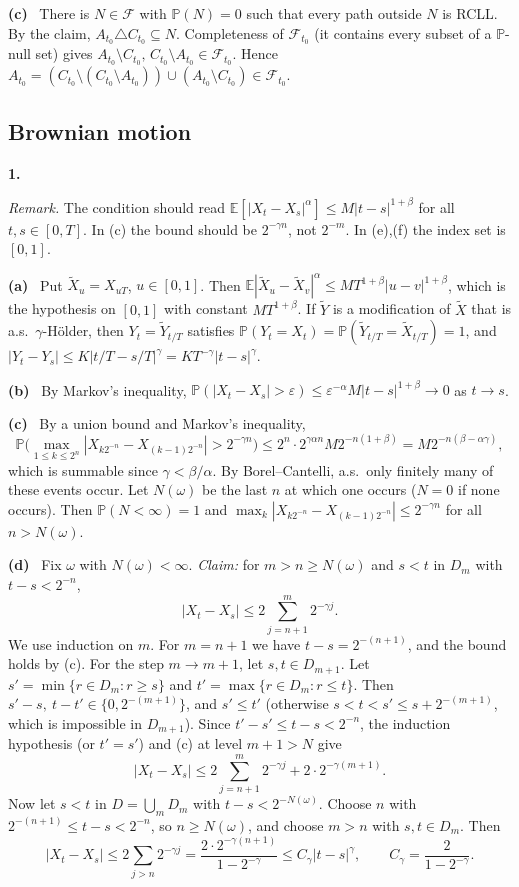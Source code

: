 \documentclass[11pt,a4paper]{article}
\newcommand{\E}{\mathbb{E}}
\renewcommand{\P}{\mathbb{P}}
\newcommand{\F}{\mathcal{F}}
\newcommand{\1}{\mathbf{1}}
\newcommand{\prob}[1]{\par\medskip\noindent\textbf{#1}\quad}
\newcommand{\sub}[1]{\par\smallskip\noindent\textbf{#1}\ }
\newcommand{\note}[1]{\par\noindent\emph{Remark.} #1}
\begin{document}
\sub{(c)} There is $N\in\F$ with $\P(N)=0$ such that every path outside $N$ is RCLL. By the claim,
$A_{t_0}\triangle C_{t_0}\subseteq N$. Completeness of $\F_{t_0}$ (it contains every subset of a
$\P$-null set) gives $A_{t_0}\setminus C_{t_0},\,C_{t_0}\setminus A_{t_0}\in\F_{t_0}$. Hence
$A_{t_0}=(C_{t_0}\setminus(C_{t_0}\setminus A_{t_0}))\cup(A_{t_0}\setminus C_{t_0})\in\F_{t_0}$.

\subsection*{Brownian motion}

\prob{1.}
\note{The condition should read $\E[|X_t-X_s|^\alpha]\le M|t-s|^{1+\beta}$ for all $t,s\in[0,T]$. In (c) the
bound should be $2^{-\gamma n}$, not $2^{-m}$. In (e),(f) the index set is $[0,1]$.}

\sub{(a)} Put $\tilde X_u=X_{uT}$, $u\in[0,1]$. Then $\E|\tilde X_u-\tilde X_v|^\alpha\le
MT^{1+\beta}|u-v|^{1+\beta}$, which is the hypothesis on $[0,1]$ with constant $MT^{1+\beta}$. If
$\tilde Y$ is a modification of $\tilde X$ that is a.s.\ $\gamma$-H\"older, then
$Y_t=\tilde Y_{t/T}$ satisfies $\P(Y_t=X_t)=\P(\tilde Y_{t/T}=\tilde X_{t/T})=1$, and
$|Y_t-Y_s|\le K|t/T-s/T|^\gamma=KT^{-\gamma}|t-s|^\gamma$.

\sub{(b)} By Markov's inequality, $\P(|X_t-X_s|>\varepsilon)\le\varepsilon^{-\alpha}M|t-s|^{1+\beta}\to0$ as $t\to s$.

\sub{(c)} By a union bound and Markov's inequality,
\[
\P\Big(\max_{1\le k\le 2^n}|X_{k2^{-n}}-X_{(k-1)2^{-n}}|>2^{-\gamma n}\Big)
\le 2^n\cdot 2^{\gamma\alpha n}M2^{-n(1+\beta)}=M2^{-n(\beta-\alpha\gamma)},
\]
which is summable since $\gamma<\beta/\alpha$. By Borel--Cantelli, a.s.\ only finitely many of these
events occur. Let $N(\omega)$ be the last $n$ at which one occurs ($N=0$ if none occurs). Then
$\P(N<\infty)=1$ and $\max_k|X_{k2^{-n}}-X_{(k-1)2^{-n}}|\le2^{-\gamma n}$ for all $n>N(\omega)$.

\sub{(d)} Fix $\omega$ with $N(\omega)<\infty$.
\emph{Claim:} for $m>n\ge N(\omega)$ and $s<t$ in $D_m$ with $t-s<2^{-n}$,
\[|X_t-X_s|\le2\sum_{j=n+1}^m2^{-\gamma j}.\]
We use induction on $m$. For $m=n+1$ we have $t-s=2^{-(n+1)}$, and the bound holds by (c). For the step
$m\to m+1$, let $s,t\in D_{m+1}$. Let $s'=\min\{r\in D_m:r\ge s\}$ and $t'=\max\{r\in D_m:r\le t\}$. Then
$s'-s,\ t-t'\in\{0,2^{-(m+1)}\}$, and $s'\le t'$ (otherwise $s<t<s'\le s+2^{-(m+1)}$, which is
impossible in $D_{m+1}$). Since $t'-s'\le t-s<2^{-n}$, the induction hypothesis (or $t'=s'$) and
(c) at level $m+1>N$ give
\[|X_t-X_s|\le 2\sum_{j=n+1}^m2^{-\gamma j}+2\cdot2^{-\gamma(m+1)}.\]
Now let $s<t$ in $D=\bigcup_mD_m$ with $t-s<2^{-N(\omega)}$. Choose $n$ with
$2^{-(n+1)}\le t-s<2^{-n}$, so $n\ge N(\omega)$, and choose $m>n$ with $s,t\in D_m$. Then
\[
|X_t-X_s|\le 2\sum_{j>n}2^{-\gamma j}=\frac{2\cdot2^{-\gamma(n+1)}}{1-2^{-\gamma}}\le C_\gamma|t-s|^\gamma,
\qquad C_\gamma=\frac{2}{1-2^{-\gamma}}.
\]
\end{document}
